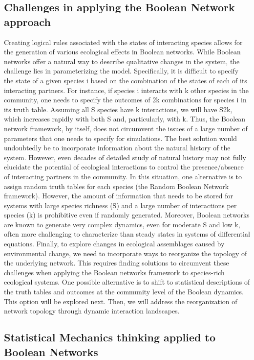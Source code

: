 \documentclass[10pt]{article}
\begin{document}
\subsection{Challenges in applying the Boolean Network approach}
Creating logical rules associated with the states of interacting species allows for the generation of various ecological effects in Boolean networks. While Boolean networks offer a natural way to describe qualitative changes in the system, the challenge lies in parameterizing the model. Specifically, it is difficult to specify the state of a given species i based on the combination of the states of each of its interacting partners. For instance, if species i interacts with k other species in the community, one needs to specify the outcomes of 2k combinations for species i in its truth table. Assuming all S species have k interactions, we will have S2k, which increases rapidly with both S and, particularly, with k. Thus, the Boolean network framework, by itself, does not circumvent the issues of a large number of parameters that one needs to specify for simulations. 
The best solution would undoubtedly be to incorporate information about the natural history of the system. However, even decades of detailed study of natural history may not fully elucidate the potential of ecological interactions to control the presence/absence of interacting partners in the community. In this situation, one alternative is to assign random truth tables for each species (the Random Boolean Network framework). However, the amount of information that needs to be stored for systems with large species richness (S) and a large number of interactions per species (k) is prohibitive even if randomly generated. Moreover, Boolean networks are known to generate very complex dynamics, even for moderate S and low k, often more challenging to characterize than steady states in systems of differential equations. Finally, to explore changes in ecological assemblages caused by environmental change, we need to incorporate ways to reorganize the topology of the underlying network. This requires finding solutions to circumvent these challenges when applying the Boolean networks framework to species-rich ecological systems. One possible alternative is to shift to statistical descriptions of the truth tables and outcomes at the community level of the Boolean dynamics. This option will be explored next. Then, we will address the reorganization of network topology through dynamic interaction landscapes.

\subsection{Statistical Mechanics thinking applied to Boolean Networks}
	
\end{document}
